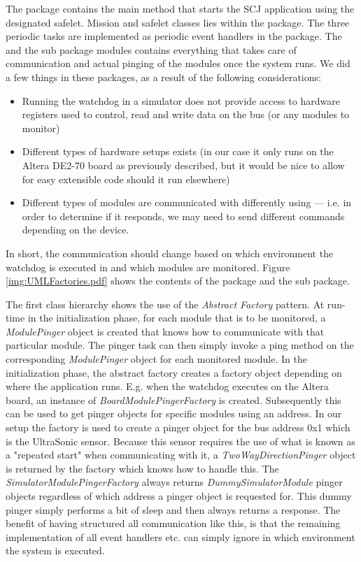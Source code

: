 The  package contains the main method that starts the SCJ application using the designated safelet. Mission and safelet classes lies within the  package. The three periodic tasks are implemented as periodic event handlers in the  package.
The  and the sub package modules contains everything that takes care of \iic communication and actual pinging of the modules once the system runs. We did a few things in these packages, as a result of the following considerations:
\begin{itemize}
    \item Running the watchdog in a simulator does not provide access to hardware registers used to control, read and write data on the \iic bus (or any modules to monitor)
    \item Different types of hardware setups exists (in our case it only runs on the Altera DE2-70 board as previously described, but it would be nice to allow for easy extensible code should it run elsewhere)
    \item Different types of modules are communicated with differently using \iic --- i.e. in order to determine if it responds, we may need to send different commands depending on the device.
\end{itemize}

In short, the communication should change based on which environment the watchdog is executed in and which modules are monitored. Figure \ref{img:UMLFactories.pdf} shows the contents of the  package and the  sub package.


The first class hierarchy shows the use of the \textit{Abstract Factory} pattern. At run-time in the initialization phase, for each module that is to be monitored, a \emph{ModulePinger} object is created that knows how to communicate with that particular module. The pinger task can then simply invoke a ping method on the corresponding \emph{ModulePinger} object for each monitored module. In the initialization phase, the abstract factory creates a factory object depending on where the application runs. E.g. when the watchdog executes on the Altera board, an instance of \emph{BoardModulePingerFactory} is created. Subsequently this can be used to get pinger objects for specific modules using an \iic address. In our setup the factory is used to create a pinger object for the \iic bus address 0x1 which is the UltraSonic sensor. Because this sensor requires the use of what is known as a "repeated start" when communicating with it, a \emph{TwoWayDirectionPinger} object is returned by the factory which knows how to handle this.
The \emph{SimulatorModulePingerFactory} always returns \emph{DummySimulatorModule} pinger objects regardless of which \iic address a pinger object is requested for. This dummy pinger simply performs a bit of sleep and then always returns a response. The benefit of having structured all communication like this, is that the remaining implementation of all event handlers etc. can simply ignore in which environment the system is executed.


